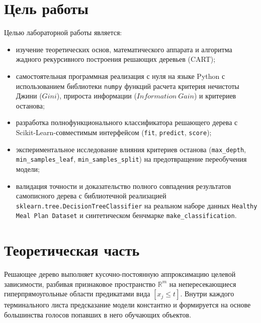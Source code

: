 \documentclass[14pt,a4paper]{extarticle}
\begin{document}
\setcounter{page}{2}

\section{Цель работы}

Целью лабораторной работы является:
\begin{itemize}
    \item изучение теоретических основ, математического аппарата и алгоритма жадного рекурсивного построения решающих деревьев (CART);
    \item самостоятельная программная реализация с нуля на языке Python с использованием библиотеки \texttt{numpy} функций расчета критерия нечистоты Джини ($Gini$), прироста информации ($Information\ Gain$) и критериев останова;
    \item разработка полнофункционального классификатора решающего дерева с Scikit-Learn-совместимым интерфейсом (\texttt{fit}, \texttt{predict}, \texttt{score});
    \item экспериментальное исследование влияния критериев останова (\texttt{max\_depth}, \texttt{min\_samples\_leaf}, \texttt{min\_samples\_split}) на предотвращение переобучения модели;
    \item валидация точности и доказательство полного совпадения результатов самописного дерева с библиотечной реализацией \texttt{sklearn.tree.DecisionTreeClassifier} на реальном наборе данных \texttt{Healthy Meal Plan Dataset} и синтетическом бенчмарке \texttt{make\_classification}.
\end{itemize}

\section{Теоретическая часть}

Решающее дерево выполняет кусочно-постоянную аппроксимацию целевой зависимости, разбивая признаковое пространство $\mathbb{R}^m$ на непересекающиеся гиперпрямоугольные области предикатами вида $[x_j \le t]$. Внутри каждого терминального листа предсказание модели константно и формируется на основе большинства голосов попавших в него обучающих объектов.
\end{document}

